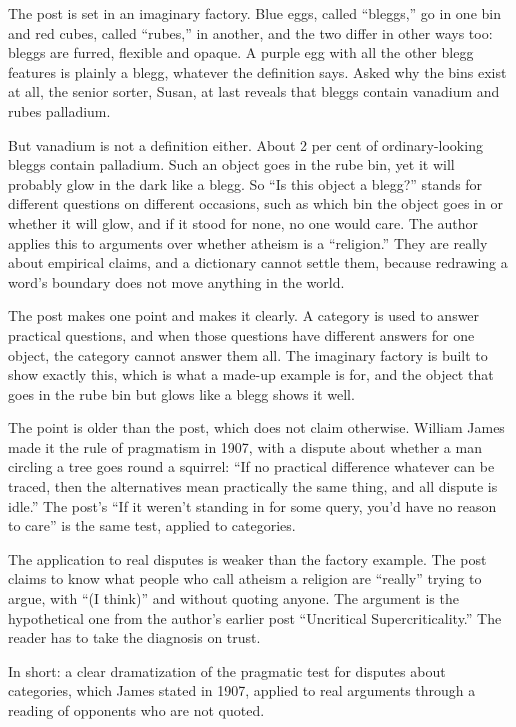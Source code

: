 \begin{afterword}
\summaryhead

The post is set in an imaginary factory. Blue eggs, called ``bleggs,'' go in one bin and red cubes, called ``rubes,'' in another, and the two differ in other ways too: bleggs are furred, flexible and opaque. A purple egg with all the other blegg features is plainly a blegg, whatever the definition says. Asked why the bins exist at all, the senior sorter, Susan, at last reveals that bleggs contain vanadium and rubes palladium.

But vanadium is not a definition either. About 2 per cent of ordinary-looking bleggs contain palladium. Such an object goes in the rube bin, yet it will probably glow in the dark like a blegg. So ``Is this object a blegg?'' stands for different questions on different occasions, such as which bin the object goes in or whether it will glow, and if it stood for none, no one would care. The author applies this to arguments over whether atheism is a ``religion.'' They are really about empirical claims, and a dictionary cannot settle them, because redrawing a word's boundary does not move anything in the world.

\responsehead

The post makes one point and makes it clearly. A category is used to answer practical questions, and when those questions have different answers for one object, the category cannot answer them all. The imaginary factory is built to show exactly this, which is what a made-up example is for, and the object that goes in the rube bin but glows like a blegg shows it well.

The point is older than the post, which does not claim otherwise. William James made it the rule of pragmatism in 1907, with a dispute about whether a man circling a tree goes round a squirrel: ``If no practical difference whatever can be traced, then the alternatives mean practically the same thing, and all dispute is idle.'' The post's ``If it weren't standing in for some query, you'd have no reason to care'' is the same test, applied to categories.

The application to real disputes is weaker than the factory example. The post claims to know what people who call atheism a religion are ``really'' trying to argue, with ``(I think)'' and without quoting anyone. The argument is the hypothetical one from the author's earlier post ``Uncritical Supercriticality.'' The reader has to take the diagnosis on trust.

In short: a clear dramatization of the pragmatic test for disputes about categories, which James stated in 1907, applied to real arguments through a reading of opponents who are not quoted.
\end{afterword}
